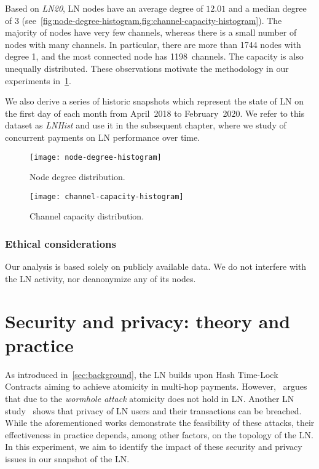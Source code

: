 Based on \emph{LN20}, 
LN nodes have an average degree of $12.01$ and a median degree of $3$ (see~\cref{fig:node-degree-histogram,fig:channel-capacity-histogram}).
The majority of nodes have very few channels, 
whereas there is a small number of nodes with many channels. 
In particular, there are more than 1744 nodes with degree 1, and the most connected node has 1198~channels.
The capacity is also unequally distributed.
These observations motivate the methodology in our experiments in~\cref{sec:sec-priv-attacks}. 

We also derive a series of historic snapshots which represent the state of LN on the first day of each month from April~2018 to February~2020.
We refer to this dataset as \textit{LNHist} 
and use it in the subsequent chapter, where we study of concurrent payments on LN performance over time.


\begin{figure}[tb]
	\centering
	\texttt{[image: node-degree-histogram]}
	\caption{Node degree distribution.\label{fig:node-degree-histogram}}
\end{figure}

\begin{figure}[tb]
	\centering
	\texttt{[image: channel-capacity-histogram]}
	\caption{Channel capacity distribution.\label{fig:channel-capacity-histogram}}
\end{figure}

\subsubsection*{Ethical considerations} 
Our analysis is based solely on publicly available data. 
We do not interfere with the LN activity, nor deanonymize any of its nodes. 


\section{Security and privacy: theory and practice}
\label{sec:sec-priv-attacks}

As introduced in~\cref{sec:background}, the LN builds upon Hash Time-Lock Contracts aiming to achieve 
atomicity in multi-hop payments.
However,~\cite{Malavolta2019} argues that due to the \emph{wormhole attack} atomicity does not hold in LN.
Another LN study~\cite{Malavolta2017} shows that privacy of LN users and their transactions can be breached.
While the aforementioned works demonstrate the feasibility of these attacks, 
their effectiveness in practice depends, among other factors, on the topology of the LN.
In this experiment, we aim to identify the impact of these security and privacy issues in our snapshot of the LN.

